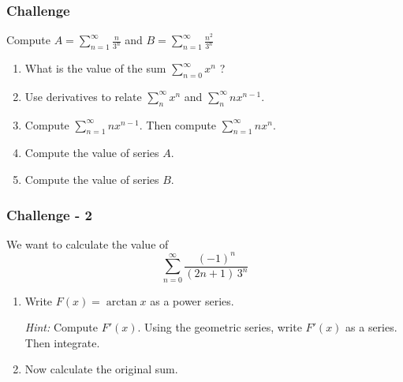 \documentclass[14pt]{beamer}
\newcommand{\p}{\pause}
\newcommand{\vv}{\vspace{.5cm}}
\begin{document}
	\begin{frame}[t]
		\frametitle{Challenge}

		Compute \quad ${\displaystyle  A = \sum_{n=1}^{\infty} \frac{n}{3^{n}} }$
		\quad and \quad
		${\displaystyle  B = \sum_{n=1}^{\infty} \frac{n^{2}}{3^{n}} }$

		\hrulefill \p

		\begin{enumerate}
			\item What is the value of the sum ${\displaystyle \sum_{n=0}^{\infty} x^n}$
				?

			\item Use derivatives to relate ${\displaystyle \sum_{n}^{\infty} x^n}$ and
				${\displaystyle \sum_{n}^{\infty} nx^{n-1}}$.

			\item Compute ${\displaystyle \sum_{n=1}^{\infty} n x^{n-1} }$. \quad Then
				compute ${\displaystyle \sum_{n=1}^{\infty} n x^{n} }$.

			\item Compute the value of series $A$.

			\item Compute the value of series $B$.
		\end{enumerate}
	\end{frame}
	\begin{frame}[t]
		\frametitle{Challenge - 2}

		We want to calculate the value of
		\[
			\sum_{n=0}^{\infty}\frac{(-1)^{n}}{(2n+1) \, 3^{n} }
		\]

		\p \hrulefill

		\begin{enumerate}
			\item Write ${\displaystyle F(x) = \arctan x}$ as a power series. \vv

				\emph{Hint:} Compute ${\displaystyle F'(x)}$. Using the geometric series,
				write ${\displaystyle F'(x)}$ as a series. Then integrate. \vv

			\item Now calculate the original sum.
		\end{enumerate}
	\end{frame}
\end{document}
